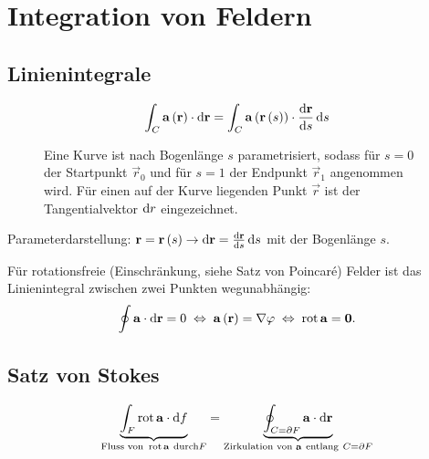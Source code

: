 \section{Integration von Feldern}


\subsection{Linienintegrale}


\begin{equation*}
	\int _{C}\mathbf{a}\left(\mathbf{r}\right)\cdot \mathop{}\!\mathrm{d} \mathbf{r}=\int _{C}\mathbf{a}\left(\mathbf{r}\left(s\right)\right)\cdot \frac{\mathop{}\!\mathrm{d} \mathbf{r}}{\mathop{}\!\mathrm{d} s}\mathop{}\!\mathrm{d} s
\end{equation*}


\begin{figure}[htb]
	\centering
	\tfigLinienintegral
	\caption{Eine Kurve ist nach Bogenlänge $s$ parametrisiert, sodass für $s=0$ der Startpunkt $\vec r_0$ und für $s=1$ der Endpunkt $\vec r_1$ angenommen wird. 
	Für einen auf der Kurve liegenden Punkt $\vec r$ ist der Tangentialvektor $\mathop{}\!\mathrm{d} r$ eingezeichnet. }
	\label{fig:vecanaylsis_curve}
\end{figure}

Parameterdarstellung: $\mathbf{r}=\mathbf{r}\left(s\right)\rightarrow \mathop{}\!\mathrm{d} \mathbf{r}=\frac{\mathop{}\!\mathrm{d} \mathbf{r}}{\mathop{}\!\mathrm{d} s}\mathop{}\!\mathrm{d} s$ mit der Bogenlänge $s$.

Für rotationsfreie (Einschränkung, siehe Satz von Poincaré) Felder ist das Linienintegral zwischen zwei Punkten wegunabhängig:
\begin{equation*}
	\oint \mathbf{a}\cdot \mathop{}\!\mathrm{d} \mathbf{r}=0\;\Leftrightarrow\; \mathbf{a}\left(\mathbf{r}\right)=\nabla \varphi \;\Leftrightarrow\; \operatorname{rot} \mathbf{a}=\mathbf{0}.
\end{equation*}


\subsection{Satz von Stokes}

\begin{equation*}
	\underset{\text{Fluss von }\operatorname{rot} \mathbf{a}~\text{durch} F}{\underbrace{ \int _{F}\operatorname{rot} \mathbf{a}\cdot \mathop{}\!\mathrm{d} f}}=\underset{\text{Zirkulation von }\mathbf{a}~\text{entlang}~ C=\partial F}{\underbrace{\oint _{C=\partial F}\mathbf{a}\cdot \mathop{}\!\mathrm{d} \mathbf{r}}}
\end{equation*}

\begin{figure}[htb]
	\centering
	\tfigHalbkugel
	\caption{}
	\label{fig:vecanaylsis_normal}
\end{figure}

